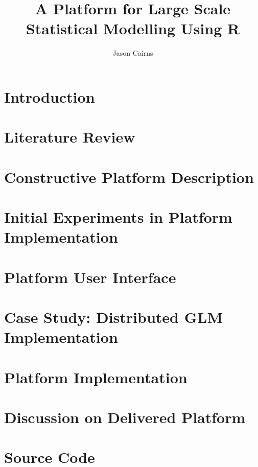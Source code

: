 \documentclass[11pt,a4paper,partial,examcopy]{aucklandthesis} %
\title{A Platform for Large Scale Statistical Modelling Using R}
\author{Jason Cairns}
\begin{document}


\chapter{Introduction}


\chapter{Literature Review}


\chapter{Constructive Platform Description}


\chapter{Initial Experiments in Platform Implementation}


\chapter{Platform User Interface}\label{sec:ui}


\chapter{Case Study: Distributed GLM Implementation}\label{sec:glm}


\chapter{Platform Implementation}


\chapter{Discussion on Delivered Platform}

\appendix
\chapter{Source Code}

\printbibliography
\end{document}
